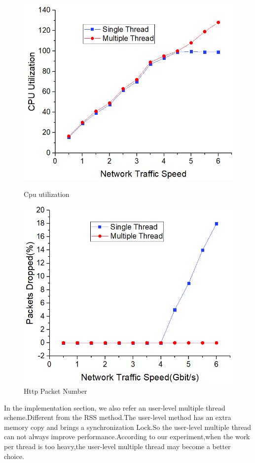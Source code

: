 \documentclass[conference]{IEEEtran}
\begin{document}
\begin{figure}
\begin{minipage}[t]{0.49\linewidth}
\flushleft
\includegraphics[width=\textwidth]{./picture/Figure10.jpg}
\caption{Cpu utilization} 
\label{fig:11}
\end{minipage}
\begin{minipage}[t]{0.49\linewidth}
\flushright
\includegraphics[width=\textwidth]{./picture/Figure11.jpg}
\caption{Http Packet Number}
\label{fig:12}
\end{minipage}
\end{figure} 
\newline\indent In the implementation section, we also refer an user-level multiple thread scheme.Different from the RSS method.The user-level method has an extra memory copy and brings a synchronization Lock.So the user-level multiple thread can not always improve performance.According to our experiment,when the work per thread is too heavy,the user-level multiple thread may become a better choice. 
\end{document}
